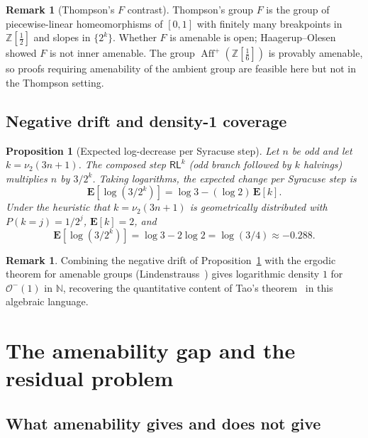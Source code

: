\documentclass[12pt, a4paper]{amsart}
\theoremstyle{plain}
\newtheorem{proposition}[theorem]{Proposition}
\theoremstyle{definition}
\newtheorem{remark}[theorem]{Remark}
\theoremstyle{remark}
\newcommand{\N}{\mathbb{N}}
\newcommand{\Z}{\mathbb{Z}}
\newcommand{\Zs}{\Z[\tfrac{1}{6}]}
\newcommand{\Aff}{\operatorname{Aff}}
\newcommand{\wL}{\mathsf{L}}
\newcommand{\wR}{\mathsf{R}}
\begin{document}
\begin{remark}[Thompson's $F$ contrast]
  Thompson's group $F$ is the group of piecewise-linear homeomorphisms
  of $[0,1]$ with finitely many breakpoints in $\Z[\frac{1}{2}]$ and
  slopes in $\{2^k\}$.  Whether $F$ is amenable is open;
  Haagerup--Olesen~\cite{Haagerup2016} showed $F$ is not inner amenable.
  The group $\Aff^+(\Zs)$ is provably amenable, so proofs requiring
  amenability of the ambient group are feasible here but not in the
  Thompson setting.
\end{remark}

\subsection{Negative drift and density-1 coverage}

\begin{proposition}[Expected log-decrease per Syracuse step]
  \label{prop:drift}
  Let $n$ be odd and let $k=\nu_2(3n+1)$.  The composed step
  $\wR\wL^k$ (odd branch followed by $k$ halvings) multiplies $n$ by
  $3/2^k$.  Taking logarithms, the expected change per Syracuse step is
  \[
    \mathbf{E}[\log(3/2^k)]
    = \log 3 - (\log 2)\,\mathbf{E}[k].
  \]
  Under the heuristic that $k=\nu_2(3n+1)$ is geometrically distributed
  with $P(k=j)=1/2^j$, $\mathbf{E}[k]=2$, and
  \[
    \mathbf{E}[\log(3/2^k)] = \log 3 - 2\log 2 = \log(3/4) \approx -0.288.
  \]
\end{proposition}

\begin{remark}
  Combining the negative drift of Proposition~\ref{prop:drift} with the
  ergodic theorem for amenable groups
  (Lindenstrauss~\cite{Lindenstrauss2001}) gives logarithmic density $1$
  for $\mathcal{O}^-(1)$ in $\N$, recovering the quantitative content of
  Tao's theorem~\cite{Tao2019} in this algebraic language.
\end{remark}

\section{The amenability gap and the residual problem}
\label{sec:gap}

\subsection{What amenability gives and does not give}
\end{document}
